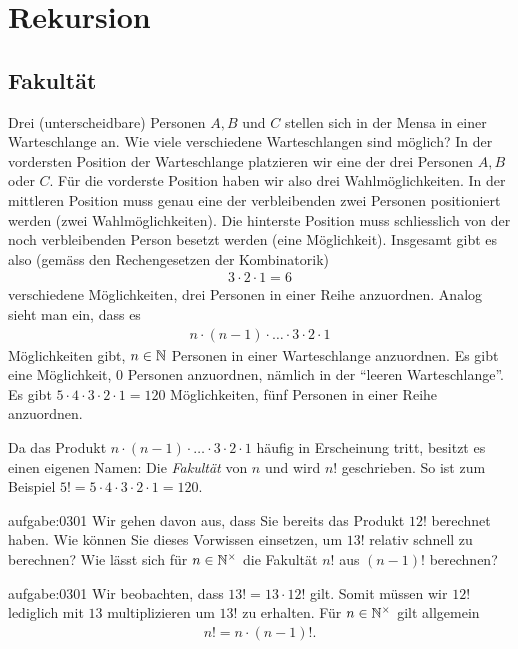 \chapter{Rekursion}\label{ch:Kapitel03}

\section{Fakultät}\label{sec:fakultaet}
Drei (unterscheidbare) Personen $A, B$ und $C$ stellen sich in der Mensa in einer Warteschlange an. Wie viele verschiedene Warteschlangen sind möglich? In der vordersten Position der Warteschlange platzieren wir eine der drei Personen $A, B$ oder $C$. Für die vorderste Position haben wir also drei Wahlmöglichkeiten. In der mittleren Position muss genau eine der verbleibenden zwei Personen positioniert werden (zwei Wahlmöglichkeiten). Die hinterste Position muss schliesslich von der noch verbleibenden Person besetzt werden (eine Möglichkeit). Insgesamt gibt es also (gemäss den Rechengesetzen der Kombinatorik)
\begin{align*}
    3\cdot 2\cdot 1 = 6
\end{align*}
verschiedene Möglichkeiten, drei Personen in einer Reihe anzuordnen. Analog sieht man ein, dass es
\begin{align*}
    n\cdot (n-1)\cdot\ldots\cdot 3\cdot 2\cdot 1
\end{align*}
Möglichkeiten gibt, $n\in\mathbb{N}$ Personen in einer Warteschlange anzuordnen. Es gibt eine Möglichkeit, $0$ Personen anzuordnen, nämlich in der \enquote{leeren Warteschlange}.
\beispiel{-}
{Es gibt $5\cdot 4\cdot 3\cdot 2\cdot 1 = 120$ Möglichkeiten, fünf Personen in einer Reihe anzuordnen.}

\noindent
Da das Produkt $n\cdot (n-1)\cdot\ldots\cdot 3\cdot 2\cdot 1$ häufig in Erscheinung tritt, besitzt es einen eigenen Namen: Die \textit{Fakultät} von $n$ und wird $n!$ geschrieben. So ist zum Beispiel $5! = 5\cdot 4\cdot 3\cdot 2\cdot 1 = 120$.

\begin{aufgabe}{aufgabe:0301}
Wir gehen davon aus, dass Sie bereits das Produkt $12!$  berechnet haben. Wie können Sie dieses Vorwissen einsetzen, um $13!$ relativ schnell zu berechnen? Wie lässt sich für $n\in\mathbb{N}^{\times}$ die Fakultät $n!$ aus $(n-1)!$ berechnen?
\end{aufgabe}
\begin{antwort}{aufgabe:0301}
Wir beobachten, dass $13! = 13\cdot 12!$ gilt. Somit müssen wir $12!$ lediglich mit $13$ multiplizieren um $13!$ zu erhalten. Für $n\in\mathbb{N}^{\times}$ gilt allgemein
\begin{align*}
    n! = n\cdot (n-1)!.
\end{align*}
\end{antwort}


